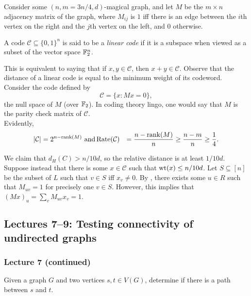 			Consider some $(n,m=3n/4,d)$-magical graph, and let $M$ be the $m\times n$ adjacency matrix of the graph, where $M_{ij}$ is $1$ iff there is an edge between the $i$th vertex on the right and the $j$th vertex on the left, and $0$ otherwise.\\

			\begin{fdef}
				A code $\mathcal{C} \subseteq \{0,1\}^n$ is said to be a \emph{linear code} if it is a subspace when viewed as a subset of the vector space $\mathbb{F}_2^n$.
			\end{fdef}
			This is equivalent to saying that if $x,y \in \mathcal{C}$, then $x+y \in \mathcal{C}$. Observe that the distance of a linear code is equal to the minimum weight of its codeword. \\

			Consider the code defined by
			\[ \mathcal{C} = \{ x : Mx = 0 \}, \]
			the null space of $M$ (over $\mathbb{F}_2$). In coding theory lingo, one would say that $M$ is the parity check matrix of $\mathcal{C}$.\\
			Evidently,
			\begin{align*}
				|\mathcal{C}| &= 2^{n - \operatorname{rank}(M)} \text{ and}
				\operatorname{Rate}(\mathcal{C}) &= \frac{n-\operatorname{rank}(M)}{n} \ge \frac{n-m}{n} \ge \frac{1}{4}.
			\end{align*}

			We claim that $d_H(C) > n/10d$, so the relative distance is at least $1/10d$. Suppose instead that there is some $x \in \mathcal{C}$ such that $\operatorname{wt}(x) \le n/10d$. Let $S \subseteq [n]$ be the subset of $L$ such that $v \in S$ iff $x_v \ne 0$. By , there exists some $u \in R$ such that $M_{uv} = 1$ for precisely one $v \in S$. However, this implies that $(Mx)_u = \sum_v M_{uv} x_{v} = 1$.

	\subsection{Lectures 7--9: Testing connectivity of undirected graphs}

		\subsubsection{Lecture 7 (continued)}

			\begin{problem*}
				Given a graph $G$ and two vertices $s,t \in V(G)$, determine if there is a path between $s$ and $t$.
			\end{problem*}

